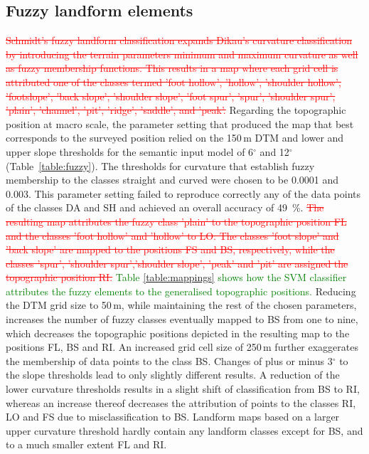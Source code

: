 \documentclass[preprint,12pt,authoryear]{elsarticle}
\begin{document}
\subsection{Fuzzy landform elements}
\textcolor{red}{\sout{Schmidt's fuzzy landform classification expands Dikau's curvature classification by introducing the terrain parameters minimum and maximum curvature as well as fuzzy membership functions. This results in a map where each grid cell is attributed one of the classes termed 'foot hollow', 'hollow', 'shoulder hollow', 'footslope', 'back slope', 'shoulder slope', 'foot spur', 'spur', 'shoulder spur', 'plain', 'channel', 'pit', 'ridge', 'saddle', and 'peak'.}}
Regarding the topographic position at macro scale, the parameter setting that produced the map that best corresponds to the surveyed position relied on the 150\,m DTM and lower and upper slope thresholds for the semantic input model of 6$^{\circ}$ and 12$^{\circ}$ (Table~\ref{table:fuzzy}). The thresholds for curvature that establish fuzzy membership to the classes straight and curved were chosen to be 0.0001 and 0.003. This parameter setting failed to reproduce correctly any of the data points of the classes DA and SH and achieved an overall accuracy of 49~\%. \textcolor{red}{\sout{The resulting map attributes the fuzzy class 'plain' to the topographic position FL and the classes 'foot hollow' and 'hollow' to LO. The classes 'foot slope' and 'back slope' are mapped to the positions FS and BS, respectively, while the classes 'spur', 'shoulder spur','shoulder slope', 'peak' and 'pit' are assigned the topographic position RI.}} \textcolor{green}{Table \ref{table:mappings} shows how the SVM classifier attributes the fuzzy elements to the generalised topographic positions. }Reducing the DTM grid size to 50\,m, while maintaining the rest of the chosen parameters, increases the number of fuzzy classes eventually mapped to BS from one to nine, which decreases the topographic positions depicted in the resulting map to the positions FL, BS and RI. An increased grid cell size of 250\,m further exaggerates the membership of data points to the class BS. Changes of plus or minus 3$^{\circ}$ to the slope thresholds lead to only slightly different results. A reduction of the lower curvature thresholds results in a slight shift of classification from BS to RI, whereas an increase thereof decreases the attribution of points to the classes RI, LO and FS due to misclassification to BS. Landform maps based on a larger upper curvature threshold hardly contain any landform classes except for BS, and to a much smaller extent FL and RI.
\end{document}
